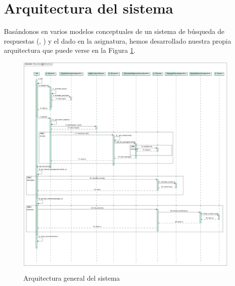 \documentclass[12pt,a4paper,titlepage]{article}
\begin{document}
\section{Arquitectura del sistema}
Basándonos en varios modelos conceptuales de un sistema de búsqueda de respuestas (\cite{modelo1}, \cite{modelo2}) y el dado en la asignatura, hemos desarrollado nuestra propia arquitectura que puede verse en la Figura \ref{fig:arquitectura}.

\begin{figure}[h!]
\begin{center}
\includegraphics[width=\textwidth]{res/secuencia}
\end{center}
\caption{Arquitectura general del sistema}
\label{fig:arquitectura}
\end{figure}
\end{document}
